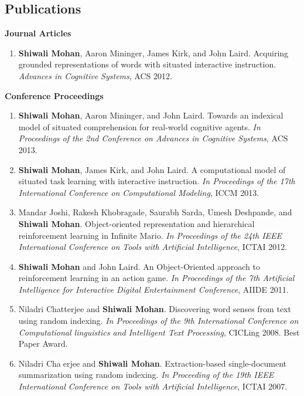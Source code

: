 \documentclass[margin,line,11pt]{res}
\begin{document}
\begin{resume}
\section{\sc Publications}
\textbf{Journal Articles}
\begin{enumerate}[label=\lbrack J\arabic*\rbrack, leftmargin=*]
\item \textbf{Shiwali Mohan}, Aaron Mininger, James Kirk, and John Laird. Acquiring grounded representations of words with situated interactive instruction. \emph{Advances in Cognitive Systems}, ACS 2012.
\end{enumerate}

\textbf{Conference Proceedings}
\begin{enumerate}[label=\lbrack C\arabic*\rbrack,leftmargin=*]
\item \textbf{Shiwali Mohan}, Aaron Mininger, and John Laird. Towards an indexical model of situated comprehension for real-world cognitive agents. \emph{In Proceedings of the 2nd Conference on Advances in Cognitive Systems}, ACS 2013.
\item \textbf{Shiwali Mohan}, James Kirk, and John Laird. A computational model of situated task learning with interactive instruction. \emph{In Proceedings of the 17th International Conference on Computational Modeling}, ICCM 2013.
\item Mandar Joshi, Rakesh Khobragade, Saurabh Sarda, Umesh Deshpande, and \textbf{Shiwali Mohan}. Object-oriented
representation and hierarchical reinforcement learning in Infinite Mario. \emph{In Proceedings of the 24th IEEE
International Conference on Tools with Artificial Intelligence}, ICTAI 2012.
\item \textbf{Shiwali Mohan} and John Laird. An Object-Oriented approach to reinforcement learning in an action game.
\emph{In Proceedings of the 7th Artificial Intelligence for Interactive Digital Entertainment Conference}, AIIDE 2011.
\item Niladri Chatterjee and \textbf{Shiwali Mohan}. Discovering word senses from text using random indexing. \emph{In
Proceedings of the 9th International Conference on Computational linguistics and Intelligent Text Processing},
CICLing 2008. Best Paper Award.
\item Niladri Chaerjee and \textbf{Shiwali Mohan}. Extraction-based single-document summarization using random
indexing. \emph{In Proceeding of the 19th IEEE International Conference on Tools with Artificial Intelligence}, ICTAI
2007.
\end{enumerate}


\end{resume}
\end{document}
